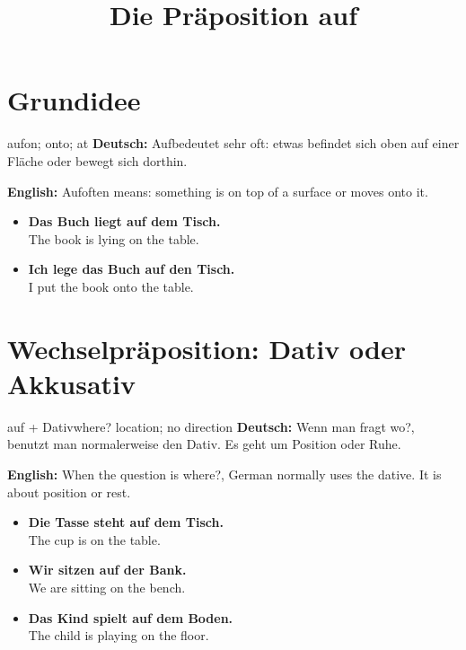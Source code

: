 \documentclass[a4paper,11pt]{article}
\title{Die Präposition \glqq auf\grqq}
\date{}
\newcommand{\GermanText}[1]{\textbf{Deutsch: }#1\par}
\newcommand{\EnglishText}[1]{{\small\color{SoftGray}\textbf{English: }#1\par}}
\newcommand{\ExampleItem}[2]{\item \textbf{#1}\\{\small\color{SoftGray}#2}}
\begin{document}
    \maketitle
    \tableofcontents
    \newpage

    \section{Grundidee}

    \begin{grammarentry}{auf}{on; onto; at}
        \GermanText{\glqq Auf\grqq bedeutet sehr oft: etwas befindet sich oben auf einer Fläche oder bewegt sich dorthin.}
        \EnglishText{\glqq Auf\grqq often means: something is on top of a surface or moves onto it.}

        \begin{exbox}
            \begin{itemize}
                \ExampleItem{Das Buch liegt auf dem Tisch.}{The book is lying on the table.}
                \ExampleItem{Ich lege das Buch auf den Tisch.}{I put the book onto the table.}
            \end{itemize}
        \end{exbox}
    \end{grammarentry}

    \section{Wechselpräposition: Dativ oder Akkusativ}

    \begin{grammarentry}{auf + Dativ}{where? location; no direction}
        \GermanText{Wenn man fragt \glqq wo?\grqq, benutzt man normalerweise den Dativ. Es geht um Position oder Ruhe.}
        \EnglishText{When the question is \glqq where?\grqq, German normally uses the dative. It is about position or rest.}

        \begin{exbox}
            \begin{itemize}
                \ExampleItem{Die Tasse steht auf dem Tisch.}{The cup is on the table.}
                \ExampleItem{Wir sitzen auf der Bank.}{We are sitting on the bench.}
                \ExampleItem{Das Kind spielt auf dem Boden.}{The child is playing on the floor.}
            \end{itemize}
        \end{exbox}
    \end{grammarentry}
\end{document}
